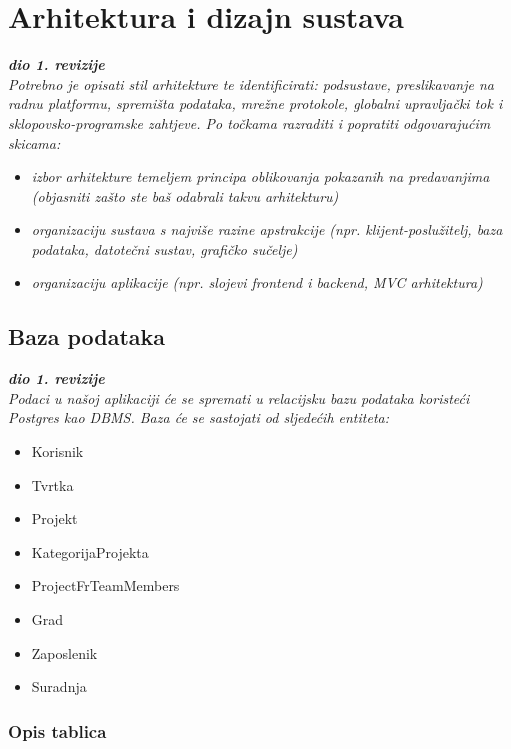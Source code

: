 \chapter{Arhitektura i dizajn sustava}
		
		\textbf{\textit{dio 1. revizije}}\\

		\textit{ Potrebno je opisati stil arhitekture te identificirati: podsustave, preslikavanje na radnu platformu, spremišta podataka, mrežne protokole, globalni upravljački tok i sklopovsko-programske zahtjeve. Po točkama razraditi i popratiti odgovarajućim skicama:}
	\begin{itemize}
		\item 	\textit{izbor arhitekture temeljem principa oblikovanja pokazanih na predavanjima (objasniti zašto ste baš odabrali takvu arhitekturu)}
		\item 	\textit{organizaciju sustava s najviše razine apstrakcije (npr. klijent-poslužitelj, baza podataka, datotečni sustav, grafičko sučelje)}
		\item 	\textit{organizaciju aplikacije (npr. slojevi frontend i backend, MVC arhitektura) }		
	\end{itemize}

	
		

		

				
		\section{Baza podataka}
			
			\textbf{\textit{dio 1. revizije}}\\
			
		\textit{Podaci u našoj aplikaciji će se spremati u relacijsku bazu podataka koristeći Postgres kao DBMS. Baza će se sastojati od sljedećih entiteta:}
		\begin{itemize}
			\item Korisnik
			\item Tvrtka
			\item Projekt
			\item KategorijaProjekta
			\item ProjectFrTeamMembers
			\item Grad
			\item Zaposlenik
			\item Suradnja
		\end{itemize}
			\subsection{Opis tablica}

